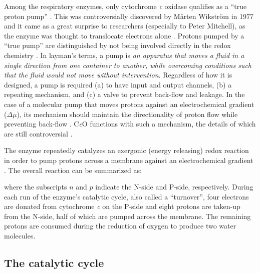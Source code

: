 Among the respiratory enzymes, only cytochrome \emph{c} oxidase qualifies as a ``true proton pump'' \cite{Brzezinski:2008p4584}. This was controversially discovered by Mårten Wikström in 1977 \cite{Wikstrom:1977p5515} and it came as a great surprise to researchers (especially to Peter Mitchell), as the enzyme was thought to translocate electrons alone \cite{Moyle:1978p10104}. Protons pumped by a ``true pump'' are distinguished by not being involved directly in the redox chemistry \cite{Capaldi:1990p10284}. In layman's terms, a pump is \emph{an apparatus that moves a fluid in a single direction from one container to another, while overcoming conditions such that the fluid would not move without intervention}. Regardless of how it is designed, a pump is required (a) to have input and output channels, (b) a repeating mechanism, and (c) a valve to prevent back-flow and leakage. In the case of a molecular pump that moves protons against an electrochemical gradient ($\Delta \mu$), its mechanism should maintain the directionality of proton flow while preventing back-flow \cite{Brzezinski:2008p4584}. C\emph{c}O functions with such a mechanism, the details of which are still controversial \cite{Qin:2009p5745}.

The enzyme repeatedly catalyzes an exergonic (energy releasing) redox reaction in order to pump protons across a membrane against an electrochemical gradient \cite{Brzezinski:2003p9848}. The overall reaction can be summarized as:
\begin{center}
\end{center}
where the subscripts $n$ and $p$ indicate the N-side and P-side, respectively. During each run of the enzyme's catalytic cycle, also called a ``turnover'', four electrons are donated from cytochrome \emph{c} on the P-side and eight protons are taken-up from the N-side, half of which are pumped across the membrane. The remaining protons are consumed during the reduction of oxygen to produce two water molecules.

\subsection{The catalytic cycle}

